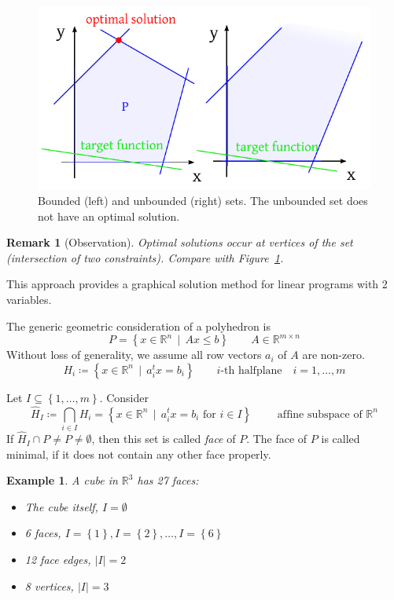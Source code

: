 \documentclass[a4paper]{article}
\numberwithin{lecref}{subsection}
\newtheorem*{Example}{Example}
\newtheorem*{Remark}{Remark}
\newcommand{\Abs}[1]{\left|#1\right|}
\newcommand{\Set}[1]{\left\{#1\right\}}
\newcommand{\SetDef}[2]{\left\{#1\,\mid\,#2\right\}}
\begin{document}
\begin{figure}[t]
	\begin{center}
		\includegraphics{img/01-bounded-set.pdf}
		\caption{Bounded (left) and unbounded (right) sets. The unbounded set does not have an optimal solution.}
		\label{img:boundedness}
	\end{center}
\end{figure}

\begin{Remark}[Observation]
  Optimal solutions occur at vertices of the set (intersection of two constraints). Compare with Figure~\ref{img:boundedness}.
\end{Remark}

This approach provides a graphical solution method for linear programs with 2 variables.

The generic geometric consideration of a polyhedron is
\[ P = \SetDef{x \in \mathbb R^n}{Ax \leq b} \qquad A \in \mathbb R^{m \times n} \]
Without loss of generality, we assume all row vectors $a_i$ of $A$ are non-zero.
\[ H_i \coloneqq \SetDef{x \in \mathbb R^n}{a_i^t x = b_i} \qquad \text{$i$-th halfplane} \quad i = 1, \dots, m \]

Let $I \subseteq \Set{1, \dots, m}$. Consider
\[ \hat H_I \coloneqq \bigcap_{i \in I} H_i = \SetDef{x \in \mathbb R^n}{a_i^t x = b_i \text{ for } i \in I} \qquad \text{ affine subspace of } \mathbb R^n \]
If $\hat H_I \cap P \neq P \neq \emptyset$, then this set is called \emph{face} of $P$.
The face of $P$ is called minimal, if it does not contain any other face properly.

\begin{Example}
	A cube in $\mathbb R^3$ has 27 faces:
	\begin{itemize}
		\item The cube itself, $I = \emptyset$
		\item 6 faces, $I = \Set{1}, I = \Set{2}, \dots, I = \Set{6}$
		\item 12 face edges, $\Abs{I} = 2$
		\item 8 vertices, $\Abs{I} = 3$
	\end{itemize}
\end{Example}
\end{document}
